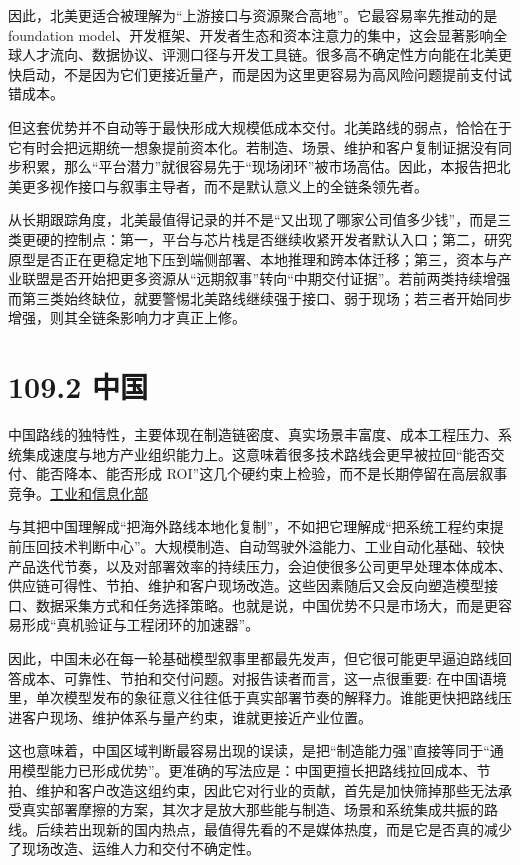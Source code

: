 因此，北美更适合被理解为“上游接口与资源聚合高地”。它最容易率先推动的是 foundation model、开发框架、开发者生态和资本注意力的集中，这会显著影响全球人才流向、数据协议、评测口径与开发工具链。很多高不确定性方向能在北美更快启动，不是因为它们更接近量产，而是因为这里更容易为高风险问题提前支付试错成本。

但这套优势并不自动等于最快形成大规模低成本交付。北美路线的弱点，恰恰在于它有时会把远期统一想象提前资本化。若制造、场景、维护和客户复制证据没有同步积累，那么“平台潜力”就很容易先于“现场闭环”被市场高估。因此，本报告把北美更多视作接口与叙事主导者，而不是默认意义上的全链条领先者。

从长期跟踪角度，北美最值得记录的并不是“又出现了哪家公司值多少钱”，而是三类更硬的控制点：第一，平台与芯片栈是否继续收紧开发者默认入口；第二，研究原型是否正在更稳定地下压到端侧部署、本地推理和跨本体迁移；第三，资本与产业联盟是否开始把更多资源从“远期叙事”转向“中期交付证据”。若前两类持续增强而第三类始终缺位，就要警惕北美路线继续强于接口、弱于现场；若三者开始同步增强，则其全链条影响力才真正上修。

\section*{109.2 中国}


中国路线的独特性，主要体现在制造链密度、真实场景丰富度、成本工程压力、系统集成速度与地方产业组织能力上。这意味着很多技术路线会更早被拉回“能否交付、能否降本、能否形成 ROI”这几个硬约束上检验，而不是长期停留在高层叙事竞争。\href{https://www.miit.gov.cn/}{工业和信息化部}

与其把中国理解成“把海外路线本地化复制”，不如把它理解成“把系统工程约束提前压回技术判断中心”。大规模制造、自动驾驶外溢能力、工业自动化基础、较快产品迭代节奏，以及对部署效率的持续压力，会迫使很多公司更早处理本体成本、供应链可得性、节拍、维护和客户现场改造。这些因素随后又会反向塑造模型接口、数据采集方式和任务选择策略。也就是说，中国优势不只是市场大，而是更容易形成“真机验证与工程闭环的加速器”。

因此，中国未必在每一轮基础模型叙事里都最先发声，但它很可能更早逼迫路线回答成本、可靠性、节拍和交付问题。对报告读者而言，这一点很重要: 在中国语境里，单次模型发布的象征意义往往低于真实部署节奏的解释力。谁能更快把路线压进客户现场、维护体系与量产约束，谁就更接近产业位置。

这也意味着，中国区域判断最容易出现的误读，是把“制造能力强”直接等同于“通用模型能力已形成优势”。更准确的写法应是：中国更擅长把路线拉回成本、节拍、维护和客户改造这组约束，因此它对行业的贡献，首先是加快筛掉那些无法承受真实部署摩擦的方案，其次才是放大那些能与制造、场景和系统集成共振的路线。后续若出现新的国内热点，最值得先看的不是媒体热度，而是它是否真的减少了现场改造、运维人力和交付不确定性。

